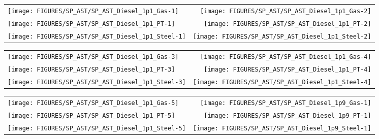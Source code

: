 \newpage

\begin{figure}[p]
\begin{tabular*}{\textwidth}{l@{\extracolsep{\fill}}r}
\texttt{[image: FIGURES/SP\_AST/SP\_AST\_Diesel\_1p1\_Gas-1]}   &  \texttt{[image: FIGURES/SP\_AST/SP\_AST\_Diesel\_1p1\_Gas-2]}    \\
\texttt{[image: FIGURES/SP\_AST/SP\_AST\_Diesel\_1p1\_PT-1]}    &  \texttt{[image: FIGURES/SP\_AST/SP\_AST\_Diesel\_1p1\_PT-2]}     \\
\texttt{[image: FIGURES/SP\_AST/SP\_AST\_Diesel\_1p1\_Steel-1]} &  \texttt{[image: FIGURES/SP\_AST/SP\_AST\_Diesel\_1p1\_Steel-2]}
\end{tabular*}
\label{SP_Diesel_1p1_1m}
\end{figure}

\begin{figure}[p]
\begin{tabular*}{\textwidth}{l@{\extracolsep{\fill}}r}
\texttt{[image: FIGURES/SP\_AST/SP\_AST\_Diesel\_1p1\_Gas-3]}   &  \texttt{[image: FIGURES/SP\_AST/SP\_AST\_Diesel\_1p1\_Gas-4]}   \\
\texttt{[image: FIGURES/SP\_AST/SP\_AST\_Diesel\_1p1\_PT-3]}    &  \texttt{[image: FIGURES/SP\_AST/SP\_AST\_Diesel\_1p1\_PT-4]}    \\
\texttt{[image: FIGURES/SP\_AST/SP\_AST\_Diesel\_1p1\_Steel-3]} &  \texttt{[image: FIGURES/SP\_AST/SP\_AST\_Diesel\_1p1\_Steel-4]}
\end{tabular*}
\label{SP_Diesel_1p1_3m}
\end{figure}

\begin{figure}[p]
\begin{tabular*}{\textwidth}{l@{\extracolsep{\fill}}r}
\texttt{[image: FIGURES/SP\_AST/SP\_AST\_Diesel\_1p1\_Gas-5]}   &  \texttt{[image: FIGURES/SP\_AST/SP\_AST\_Diesel\_1p9\_Gas-1]}   \\
\texttt{[image: FIGURES/SP\_AST/SP\_AST\_Diesel\_1p1\_PT-5]}    &  \texttt{[image: FIGURES/SP\_AST/SP\_AST\_Diesel\_1p9\_PT-1]}    \\
\texttt{[image: FIGURES/SP\_AST/SP\_AST\_Diesel\_1p1\_Steel-5]} &  \texttt{[image: FIGURES/SP\_AST/SP\_AST\_Diesel\_1p9\_Steel-1]}
\end{tabular*}
\label{SP_Diesel_1p1_5m}
\end{figure}

